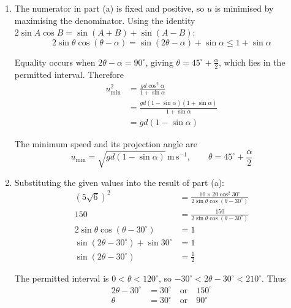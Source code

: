 \documentclass[leqno]{article}
\begin{document}
\begin{enumerate}[
  label=\textbf{\arabic*.},
  leftmargin=*,
  topsep=0pt,
  partopsep=0pt,
  parsep=0pt
]
\begin{djsSolution}
\begin{enumerate}[label=\textbf{(\alph*)}, start=1]
Since the next meeting with the plane occurs at \(t>0\), dividing by \(t\) gives
\[
t=\frac{2u\sin\theta}{g\cos\alpha}\,\mathrm{s}
\]

Hence, using the horizontal displacement to \(R\):
\begin{align*}
d\cos\alpha
&=u\cos(\theta-\alpha)\left(\frac{2u\sin\theta}{g\cos\alpha}\right)\\
gd\cos^2\alpha
&=2u^2\sin\theta\cos(\theta-\alpha)\\
u^2&=\frac{gd\cos^2\alpha}{2\sin\theta\cos(\theta-\alpha)}
\end{align*}

\item The numerator in part (a) is fixed and positive, so \(u\) is minimised by maximising the denominator. Using the identity \(2\sin A\cos B=\sin(A+B)+\sin(A-B)\):
\[
2\sin\theta\cos(\theta-\alpha)
=\sin(2\theta-\alpha)+\sin\alpha
\leq 1+\sin\alpha
\]

Equality occurs when \(2\theta-\alpha=90^\circ\), giving \(\theta=45^\circ+\frac{\alpha}{2}\), which lies in the permitted interval. Therefore
\begin{align*}
u_{\min}^2
&=\frac{gd\cos^2\alpha}{1+\sin\alpha}\\
&=\frac{gd(1-\sin\alpha)(1+\sin\alpha)}{1+\sin\alpha}\\
&=gd(1-\sin\alpha)
\end{align*}

The minimum speed and its projection angle are
\[
u_{\min}=\sqrt{gd(1-\sin\alpha)}\,\mathrm{m\,s^{-1}},\qquad
\theta=45^\circ+\frac{\alpha}{2}
\]

\item Substituting the given values into the result of part (a):
\begin{align*}
(5\sqrt6)^2
&=\frac{10\times20\cos^2 30^\circ}{2\sin\theta\cos(\theta-30^\circ)}\\
150&=\frac{150}{2\sin\theta\cos(\theta-30^\circ)}\\
2\sin\theta\cos(\theta-30^\circ)&=1\\
\sin(2\theta-30^\circ)+\sin30^\circ&=1\\
\sin(2\theta-30^\circ)&=\frac12
\end{align*}

The permitted interval is \(0<\theta<120^\circ\), so \(-30^\circ<2\theta-30^\circ<210^\circ\). Thus
\begin{align*}
2\theta-30^\circ&=30^\circ\quad\text{or}\quad150^\circ\\
\theta&=30^\circ\quad\text{or}\quad90^\circ
\end{align*}


\end{enumerate}
\end{djsSolution}
\end{enumerate}
\end{document}
